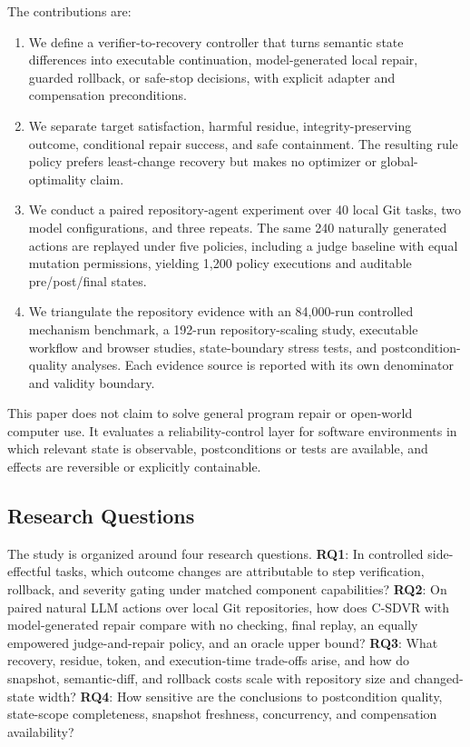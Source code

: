 \documentclass[pdflatex,sn-apa]{sn-jnl}
\begin{document}
The contributions are:
\begin{enumerate}[leftmargin=*]
  \item We define a verifier-to-recovery controller that turns semantic state differences into executable continuation, model-generated local repair, guarded rollback, or safe-stop decisions, with explicit adapter and compensation preconditions.
  \item We separate target satisfaction, harmful residue, integrity-preserving outcome, conditional repair success, and safe containment. The resulting rule policy prefers least-change recovery but makes no optimizer or global-optimality claim.
  \item We conduct a paired repository-agent experiment over 40 local Git tasks, two model configurations, and three repeats. The same 240 naturally generated actions are replayed under five policies, including a judge baseline with equal mutation permissions, yielding 1,200 policy executions and auditable pre/post/final states.
  \item We triangulate the repository evidence with an 84,000-run controlled mechanism benchmark, a 192-run repository-scaling study, executable workflow and browser studies, state-boundary stress tests, and postcondition-quality analyses. Each evidence source is reported with its own denominator and validity boundary.
\end{enumerate}

This paper does not claim to solve general program repair or open-world computer use. It evaluates a reliability-control layer for software environments in which relevant state is observable, postconditions or tests are available, and effects are reversible or explicitly containable.

\subsection{Research Questions}

The study is organized around four research questions.
\textbf{RQ1}: In controlled side-effectful tasks, which outcome changes are attributable to step verification, rollback, and severity gating under matched component capabilities?
\textbf{RQ2}: On paired natural LLM actions over local Git repositories, how does C-SDVR with model-generated repair compare with no checking, final replay, an equally empowered judge-and-repair policy, and an oracle upper bound?
\textbf{RQ3}: What recovery, residue, token, and execution-time trade-offs arise, and how do snapshot, semantic-diff, and rollback costs scale with repository size and changed-state width?
\textbf{RQ4}: How sensitive are the conclusions to postcondition quality, state-scope completeness, snapshot freshness, concurrency, and compensation availability?
\end{document}
